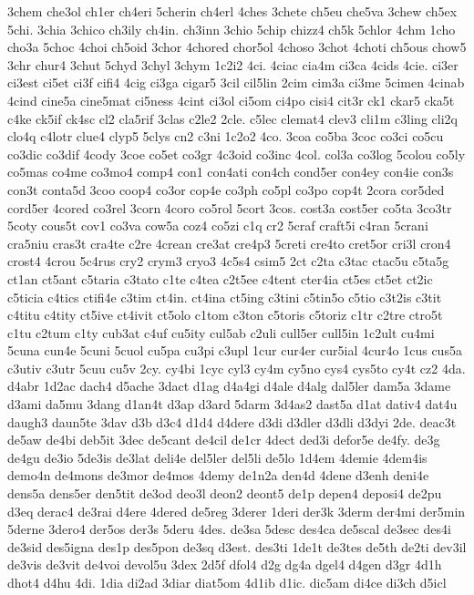 {3chem
che3ol
ch1er
ch4eri
5cherin
ch4erl
4ches
3chete
ch5eu
che5va
3chew
ch5ex
5chi.
3chia
3chico
ch3ily
ch4in.
ch3inn
3chio
5chip
chizz4
ch5k
5chlor
4chm
1cho
cho3a
5choc
4choi
ch5oid
3chor
4chored
chor5ol
4choso
3chot
4choti
ch5ous
chow5
3chr
chur4
3chut
5chyd
3chyl
3chym
1c2i2
4ci.
4ciac
cia4m
ci3ca
4cids
4cie.
ci3er
ci3est
ci5et
ci3f
cifi4
4cig
ci3ga
cigar5
3cil
cil5lin
2cim
cim3a
ci3me
5cimen
4cinab
4cind
cine5a
cine5mat
ci5ness
4cint
ci3ol
ci5om
ci4po
cisi4
cit3r
ck1
ckar5
cka5t
c4ke
ck5if
ck4sc
cl2
cla5rif
3clas
c2le2
2cle.
c5lec
clemat4
clev3
cli1m
c3ling
cli2q
clo4q
c4lotr
clue4
clyp5
5clys
cn2
c3ni
1c2o2
4co.
3coa
co5ba
3coc
co3ci
co5cu
co3dic
co3dif
4cody
3coe
co5et
co3gr
4c3oid
co3inc
4col.
col3a
co3log
5colou
co5ly
co5mas
co4me
co3mo4
comp4
con1
con4ati
con4ch
cond5er
con4ey
con4ie
con3s
con3t
conta5d
3coo
coop4
co3or
cop4e
co3ph
co5pl
co3po
cop4t
2cora
cor5ded
cord5er
4cored
co3rel
3corn
4coro
co5rol
5cort
3cos.
cost3a
cost5er
co5ta
3co3tr
5coty
cous5t
cov1
co3va
cow5a
coz4
co5zi
c1q
cr2
5craf
craft5i
c4ran
5crani
cra5niu
cras3t
cra4te
c2re
4crean
cre3at
cre4p3
5creti
cre4to
cret5or
cri3l
cron4
crost4
4crou
5c4rus
cry2
crym3
cryo3
4c5s4
csim5
2ct
c2ta
c3tac
ctac5u
c5ta5g
ct1an
ct5ant
c5taria
c3tato
c1te
c4tea
c2t5ee
c4tent
cter4ia
ct5es
ct5et
ct2ic
c5ticia
c4tics
ctifi4e
c3tim
ct4in.
ct4ina
ct5ing
c3tini
c5tin5o
c5tio
c3t2is
c3tit
c4titu
c4tity
ct5ive
ct4ivit
ct5olo
c1tom
c3ton
c5toris
c5toriz
c1tr
c2tre
ctro5t
c1tu
c2tum
c1ty
cub3at
c4uf
cu5ity
cul5ab
c2uli
cull5er
cull5in
1c2ult
cu4mi
5cuna
cun4e
5cuni
5cuol
cu5pa
cu3pi
c3upl
1cur
cur4er
cur5ial
4cur4o
1cus
cus5a
c3utiv
c3utr
5cuu
cu5v
2cy.
cy4bi
1cyc
cyl3
cy4m
cy5no
cys4
cys5to
cy4t
cz2
4da.
d4abr
1d2ac
dach4
d5ache
3dact
d1ag
d4a4gi
d4ale
d4alg
dal5ler
dam5a
3dame
d3ami
da5mu
3dang
d1an4t
d3ap
d3ard
5darm
3d4as2
dast5a
d1at
dativ4
dat4u
daugh3
daun5te
3dav
d3b
d3c4
d1d4
d4dere
d3di
d3dler
d3dli
d3dyi
2de.
deac3t
de5aw
de4bi
deb5it
3dec
de5cant
de4cil
de1cr
4dect
ded3i
defor5e
de4fy.
de3g
de4gu
de3io
5de3is
de3lat
deli4e
del5ler
del5li
de5lo
1d4em
4demie
4dem4is
demo4n
de4mons
de3mor
de4mos
4demy
de1n2a
den4d
4dene
d3enh
deni4e
dens5a
dens5er
den5tit
de3od
deo3l
deon2
deont5
de1p
depen4
deposi4
de2pu
d3eq
derac4
de3rai
d4ere
4dered
de5reg
3derer
1deri
der3k
3derm
der4mi
der5min
5derne
3dero4
der5os
der3s
5deru
4des.
de3sa
5desc
des4ca
de5scal
de3sec
des4i
de3sid
des5igna
des1p
des5pon
de3sq
d3est.
des3ti
1de1t
de3tes
de5th
de2ti
dev3il
de3vis
de3vit
de4voi
devol5u
3dex
2d5f
dfol4
d2g
dg4a
dgel4
d4gen
d3gr
4d1h
dhot4
d4hu
4di.
1dia
di2ad
3diar
diat5om
4d1ib
d1ic.
dic5am
di4ce
di3ch
d5icl
}

